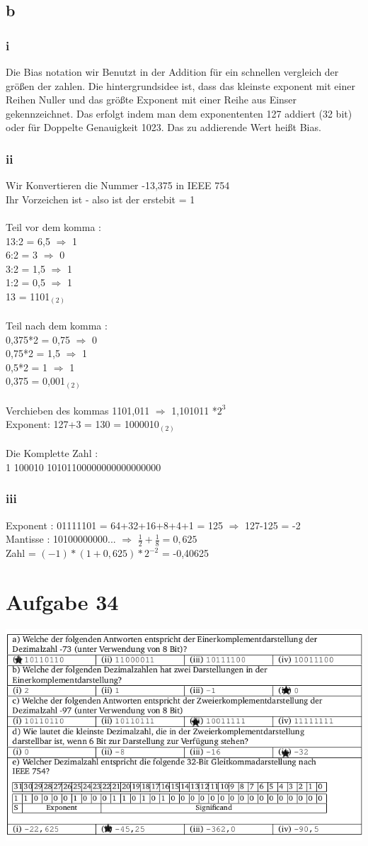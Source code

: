 \documentclass[10pt,a4paper]{article}
\begin{document}
\subsection{b}
\subsubsection{i}
Die Bias notation wir Benutzt in der Addition für ein schnellen vergleich der größen der zahlen.
Die hintergrundsidee ist, dass das kleinste exponent mit einer Reihen Nuller und das größte Exponent mit einer Reihe aus Einser gekennzeichnet. Das erfolgt indem man dem exponententen 127 addiert (32 bit) oder für Doppelte Genauigkeit 1023.
Das zu addierende Wert heißt Bias.
\subsubsection{ii}
Wir Konvertieren die Nummer -13,375 in IEEE 754\\
Ihr Vorzeichen ist - also ist der erstebit = 1\\\\
Teil vor dem komma :\\
13:2 = 6,5 $\Rightarrow$ 1\\
6:2 = 3 $\Rightarrow$ 0\\
3:2 = 1,5 $\Rightarrow$ 1\\
1:2 = 0,5 $\Rightarrow$ 1\\
13 = 1101$_{(2)}$\\\\
Teil nach dem komma :\\
0,375*2 = 0,75 $\Rightarrow$ 0\\
0,75*2 = 1,5 $\Rightarrow$ 1\\
0,5*2 = 1 $\Rightarrow$ 1\\
0,375 = 0,001$_{(2)}$\\\\
Verchieben des kommas 1101,011 $\Rightarrow$ 1,101011 *$2^3$\\
Exponent: 127+3 = 130 = 1000010$_{(2)}$\\\\
Die Komplette Zahl : \\
1 100010 10101100000000000000000
\subsubsection{iii}
Exponent : 01111101 = 64+32+16+8+4+1 = 125 $\Rightarrow$ 127-125 = -2\\
Mantisse : 10100000000... $\Rightarrow$ $\frac{1}{2}+\frac{1}{8} = 0,625$\\
Zahl = $(-1)*(1+0,625)*2^{-2}$ = -0,40625
\section{Aufgabe 34}
\includegraphics[scale=0.5]{a.png} 
\end{document}
